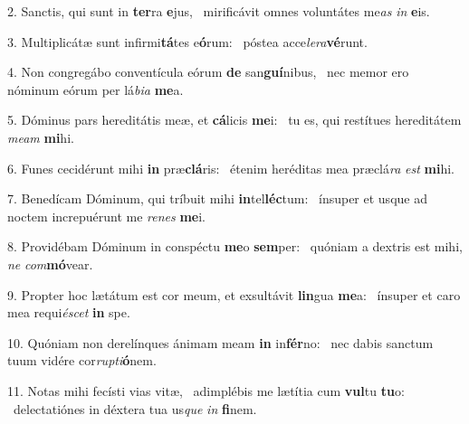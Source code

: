 2. Sanctis, qui sunt in \textbf{ter}ra \textbf{e}jus, \ast\  mirificávit omnes voluntátes me\textit{as} \textit{in} \textbf{e}is.\

3. Multiplicátæ sunt infirmi\textbf{tá}tes e\textbf{ó}rum: \ast\  póstea acce\textit{le}\textit{ra}\textbf{vé}runt.\

4. Non congregábo conventícula eórum \textbf{de} san\textbf{guí}nibus, \ast\  nec memor ero nóminum eórum per lá\textit{bi}\textit{a} \textbf{me}a.\

5. Dóminus pars hereditátis meæ, et \textbf{cá}licis \textbf{me}i: \ast\  tu es, qui restítues hereditátem \textit{me}\textit{am} \textbf{mi}hi.\

6. Funes cecidérunt mihi \textbf{in} præ\textbf{clá}ris: \ast\  étenim heréditas mea præclá\textit{ra} \textit{est} \textbf{mi}hi.\

7. Benedícam Dóminum, qui tríbuit mihi \textbf{in}tel\textbf{léc}tum: \ast\  ínsuper et usque ad noctem increpuérunt me \textit{re}\textit{nes} \textbf{me}i.\

8. Providébam Dóminum in conspéctu \textbf{me}o \textbf{sem}per: \ast\  quóniam a dextris est mihi, \textit{ne} \textit{com}\textbf{mó}vear.\

9. Propter hoc lætátum est cor meum, et exsultávit \textbf{lin}gua \textbf{me}a: \ast\  ínsuper et caro mea requi\textit{é}\textit{scet} \textbf{in} spe.\

10. Quóniam non derelínques ánimam meam \textbf{in} in\textbf{fér}no: \ast\  nec dabis sanctum tuum vidére cor\textit{rup}\textit{ti}\textbf{ó}nem.\

11. Notas mihi fecísti vias vitæ, \dag\  adimplébis me lætítia cum \textbf{vul}tu \textbf{tu}o: \ast\  delectatiónes in déxtera tua us\textit{que} \textit{in} \textbf{fi}nem.\

